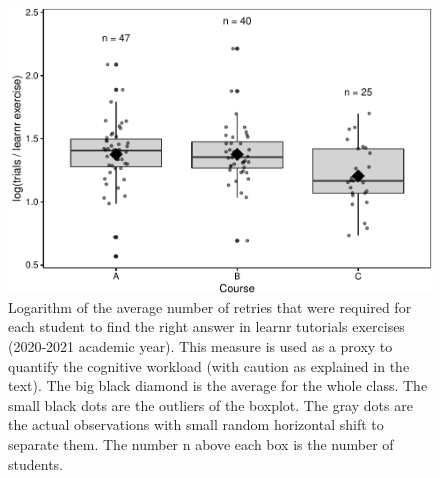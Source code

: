 \documentclass{aims}
\theoremstyle{definition}
\begin{document}
\begin{figure}
\includegraphics[width=1\linewidth]{teaching_data_science_files/figure-latex/fig_learn_trials-1} \caption{\label{fig:fig_learn_trials} Logarithm of the average number of retries that were required for each student to find the right answer in learnr tutorials exercises (2020-2021 academic year). This measure is used as a proxy to quantify the cognitive workload (with caution as explained in the text). The big black diamond is the average for the whole class. The small black dots are the outliers of the boxplot. The gray dots are the actual observations with small random horizontal shift to separate them. The number n above each box is the number of students.}\label{fig:fig_learn_trials}
\end{figure}
\end{document}
